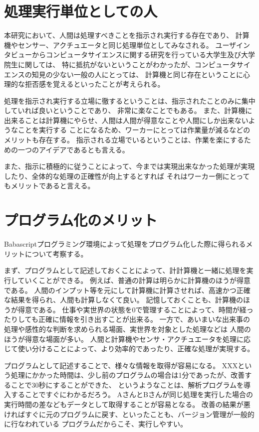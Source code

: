 \section{処理実行単位としての人}\label{ux51e6ux7406ux5b9fux884cux5358ux4f4dux3068ux3057ux3066ux306eux4eba}

本研究において、人間は処理すべきことを指示され実行する存在であり、
計算機やセンサー、アクチュエータと同じ処理単位としてみなされる。
ユーザインタビューからコンピュータサイエンスに関する研究を行っている大学生及び大学院生に関しては、
特に抵抗がないということがわかったが、コンピュータサイエンスの知見の少ない一般の人にとっては、
計算機と同じ存在ということに心理的な拒否感を覚えるといったことが考えられる。

処理を指示され実行する立場に徹するということは、指示されたことのみに集中していれば良いということであり、
非常に楽なことでもある。
また、計算機に出来ることは計算機にやらせ、人間は人間が得意なことや人間にしか出来ないようなことを実行する
ことになるため、ワーカーにとっては作業量が減るなどのメリットも存在する。
指示される立場でいるということは、作業を楽にするための一つのアイデアであるとも言える。

また、指示に積極的に従うことによって、今までは実現出来なかった処理が実現したり、全体的な処理の正確性が向上するとすれば
それはワーカー側にとってもメリットであると言える。

\section{プログラム化のメリット}\label{ux30d7ux30edux30b0ux30e9ux30e0ux5316ux306eux30e1ux30eaux30c3ux30c8}

Babascriptプログラミング環境によって処理をプログラム化した際に得られるメリットについて考察する。

まず、プログラムとして記述しておくことによって、計計算機と一緒に処理を実行していくことができる。
例えば、普通の計算は明らかに計算機のほうが得意である。
人間のインプット等を元にして計算機に計算させれば、高速かつ正確な結果を得られ、人間も計算しなくて良い。
記憶しておくことも、計算機のほうが得意である。
仕事や実世界の状態を0で管理することによって、時間が経ったりしても正確に情報を引き出すことが出来る。
一方で、あいまいな出来事の処理や感性的な判断を求められる場面、実世界を対象とした処理などは
人間のほうが得意な場面が多い。
人間と計算機やセンサ・アクチュエータを処理に応じて使い分けることによって、より効率的であったり、正確な処理が実現する。

プログラムとして記述することで、様々な情報を取得が容易になる。
XXXという処理にかかった時間は、少し前のプログラムの場合は1分であったが、改善することで30秒にすることができた、
というようなことは、解析プログラムを導入することですぐにわかるだろう。
AさんとBさんが同じ処理を実行した場合の実行時間の差などもデータとして取得することが容易となる。
改善の結果が悪ければすぐに元のプログラムに戻す、といったことも、バージョン管理が一般的に行なわれている
プログラムだからこそ、実行しやすい。

